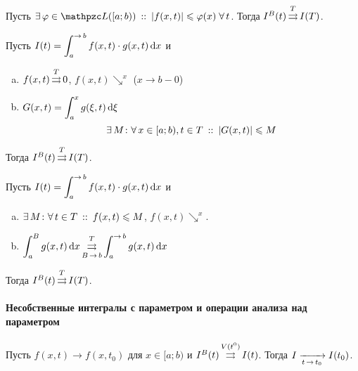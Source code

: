 \documentclass[12pt, timbord]{longnotes}
\begin{document}
\begin{thrm}\label{thrm:meas::paruniconv::wei}
  Пусть $\exists\, \varphi\in \summb([a;b))\that |f(x,t)| \leqslant \varphi (x)\; \forall\, t$.
  Тогда $I^B(t) \mathop{\rightrightarrows}\limits^T I(T)$.
\end{thrm}

\begin{thrm}\label{thrm:meas::paruniconv::dir}
  Пусть $I(t) = \dint_{a}^{\to b} f(x,t) \cdot g(x,t) \, \del x$ и
  \begin{enumerate}[a)]
    \item $f(x,t) \mathop{\rightrightarrows}\limits^T 0$, $f(x,t) \searrow^x$ ($x\to b-0$)
    \item $G(x,t) = \displaystyle\int_a^x g(\xi, t) \, \mathrm{d} \xi$
      \[
        \exists\, M \colon \forall\, x \in [a;b), t\in T \:::\: | G(x,t) | \leqslant M   
      \]
  \end{enumerate}
  Тогда $I^B(t) \mathop{\rightrightarrows}\limits^T I(T)$.
\end{thrm}

\begin{thrm}\label{thrm:meas::paruniconv::abel}
  Пусть $I(t) = \dint_{a}^{\to b} f(x,t) \cdot g(x,t) \, \del x$ и
  \begin{enumerate}[a)]
    \item $\exists\, M \colon \forall\, t\in T \:::\: f(x,t) \leqslant M$,
      $f(x,t) \searrow^x$.
    \item 
      $\displaystyle
      \int_a^{B} g(x,t) \, \del x \unito^T_{B\to b} \int_a^{\to b} g(x,t) \, \del x 
      $
  \end{enumerate}
  Тогда $I^B(t) \mathop{\rightrightarrows}\limits^T I(T)$.
\end{thrm}

\paragraph{Несобственные интегралы с параметром и операции анализа над параметром \underdev}
\label{par:meas::parimpconv}

\begin{thrm}\label{thrm:meas::parimpconv::lim}
  Пусть $f(x,t) \to f(x,t_0)$ для \alev $x \in [a;b)$ и $I^B(t) \mathop{\rightrightarrows}\limits^{V(t^0)} I(t)$.
  Тогда $I \xto{t\to t_0} I(t_0)$.
\end{thrm}
\end{document}
